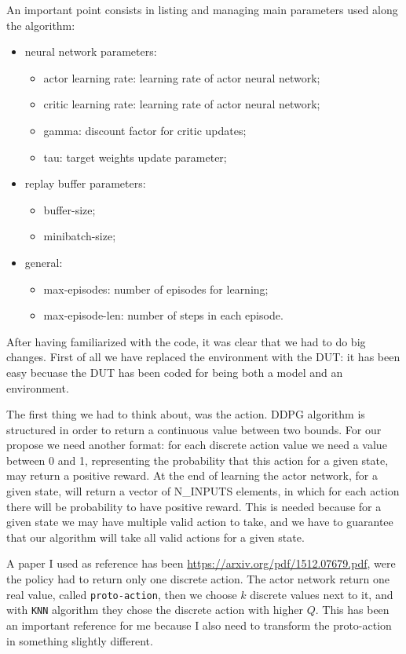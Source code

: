 \documentclass{article}
\begin{document}
An important point consists in listing and managing main parameters used along the algorithm:
\begin{itemize}
\item neural network parameters:
\begin{itemize}
\item actor learning rate: learning rate of actor neural network;
\item critic learning rate: learning rate of actor neural network;
\item gamma: discount factor for critic updates;
\item tau: target weights update parameter;
\end{itemize}
\item replay buffer parameters:
\begin{itemize}
\item buffer-size;
\item minibatch-size;
\end{itemize}
\item general:
\begin{itemize}
\item max-episodes: number of episodes for learning;
\item max-episode-len: number of steps in each episode.
\end{itemize}
\end{itemize}

After having familiarized with the code, it was clear that we had to do big changes. First of all we have replaced the environment with the DUT: it has been easy becuase the DUT has been coded for being both a model and an environment. 

The first thing we had to think about, was the action. DDPG algorithm is structured in order to return a continuous value between two bounds. For our propose we need another format: for each discrete action value we need a value between 0 and 1, representing the probability that this action for a given state, may return a positive reward. At the end of learning the actor network, for a given state, will return a vector of N\_INPUTS elements, in which for each action there will be probability to have positive reward. This is needed because for a given state we may have multiple valid action to take, and we have to guarantee that our algorithm will take all valid actions for a given state.

A paper I used as reference has been \href{Deep Reinforcement Learning in Large Discrete Action Spaces}{https://arxiv.org/pdf/1512.07679.pdf}, were the policy had to return only one discrete action. The actor network return one real value, called \texttt{proto-action}, then we choose $k$ discrete values next to it, and with \texttt{KNN} algorithm they chose the discrete action with higher $Q$. This has been an important reference for me because I also need to transform the proto-action in something slightly different.
\end{document}
